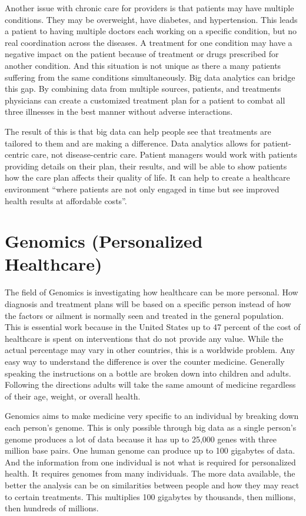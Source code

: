 \documentclass[sigconf]{acmart}
\begin{document}
Another issue with chronic care for providers is that patients may 
have multiple conditions.  They may be overweight, have diabetes, 
and hypertension.  This leads a patient to having multiple doctors 
each working on a specific condition, but no real coordination 
across the diseases.  A treatment for one condition may have a 
negative impact on the patient because of treatment or drugs 
prescribed for another condition.  And this situation is not unique 
as there a many patients suffering from the same conditions 
simultaneously.  Big data analytics can bridge this gap.  By combining 
data from multiple sources, patients, and treatments physicians can 
create a customized treatment plan for a patient to combat all three 
illnesses in the best manner without adverse 
interactions\cite{HealthCatalyst}.

The result of this is that big data can help people see that 
treatments are tailored to them and are making a difference.  Data 
analytics allows for patient-centric care, not disease-centric care.  
Patient managers would work with patients providing details on their 
plan, their results, and will be able to show patients how the care 
plan affects their quality of life.  It can help to create a 
healthcare environment ``where patients are not only engaged in time 
but see improved health results at affordable costs''\cite{Innovaccer}.

\section{Genomics (Personalized Healthcare)}
The field of Genomics is investigating how healthcare can be more 
personal.  How diagnosis and treatment plans will be based on a 
specific person instead of how the factors or ailment is normally 
seen and treated in the general population.  This is essential work 
because in the United States up to 47 percent of the cost of 
healthcare is spent on interventions that do not provide any value.  
While the actual percentage may vary in other countries, this is a 
worldwide problem\cite{PMC4287097}.  Any easy way to understand 
the difference is over the counter medicine.  Generally speaking 
the instructions on a bottle are broken down into children and 
adults.  Following the directions adults will take the same amount 
of medicine regardless of their age, weight, or overall health. 

Genomics aims to make medicine very specific to an individual by 
breaking down each person's genome.  This is only possible through 
big data as a single person's genome produces a lot of data because 
it has up to 25,000 genes with three million base pairs.  One human 
genome can produce up to 100 gigabytes of data\cite{OReilly}.  And 
the information from one individual is not what is required for 
personalized health.  It requires genomes from many individuals.  
The more data available, the better the analysis can be on 
similarities between people and how they may react to certain 
treatments.  This multiplies 100 gigabytes by thousands, then 
millions, then hundreds of millions.
\end{document}
